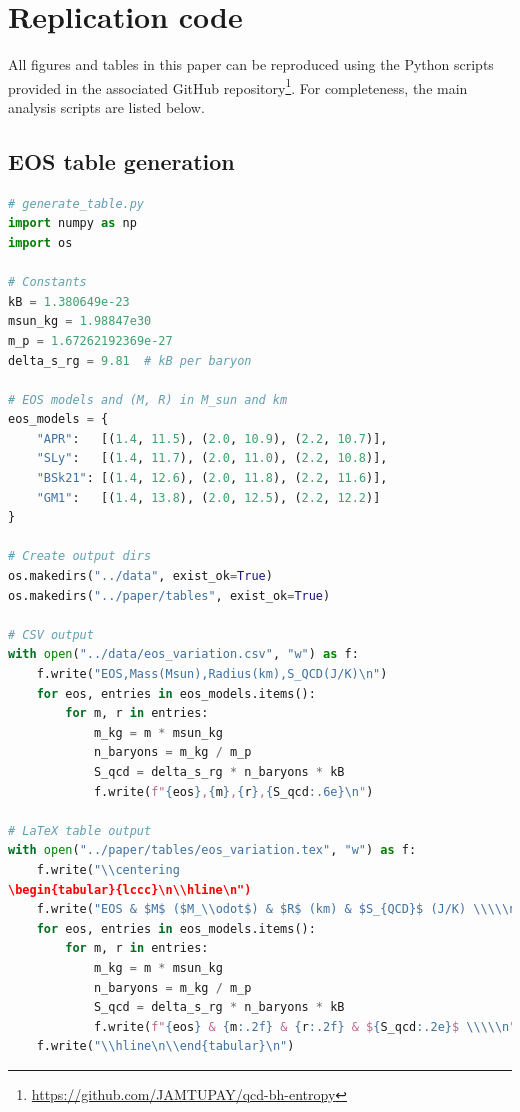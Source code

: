 \documentclass[aps,prd,onecolumn,nofootinbib,superscriptaddress]{revtex4-2}
\begin{document}
\appendix
\section{Replication code}
\label{app:code}

All figures and tables in this paper can be reproduced using the Python scripts provided in the associated GitHub repository\footnote{\url{https://github.com/JAMTUPAY/qcd-bh-entropy}}.  
For completeness, the main analysis scripts are listed below.

\subsection{EOS table generation}
\begin{lstlisting}[language=Python]
# generate_table.py
import numpy as np
import os

# Constants
kB = 1.380649e-23
msun_kg = 1.98847e30
m_p = 1.67262192369e-27
delta_s_rg = 9.81  # kB per baryon

# EOS models and (M, R) in M_sun and km
eos_models = {
    "APR":   [(1.4, 11.5), (2.0, 10.9), (2.2, 10.7)],
    "SLy":   [(1.4, 11.7), (2.0, 11.0), (2.2, 10.8)],
    "BSk21": [(1.4, 12.6), (2.0, 11.8), (2.2, 11.6)],
    "GM1":   [(1.4, 13.8), (2.0, 12.5), (2.2, 12.2)]
}

# Create output dirs
os.makedirs("../data", exist_ok=True)
os.makedirs("../paper/tables", exist_ok=True)

# CSV output
with open("../data/eos_variation.csv", "w") as f:
    f.write("EOS,Mass(Msun),Radius(km),S_QCD(J/K)\n")
    for eos, entries in eos_models.items():
        for m, r in entries:
            m_kg = m * msun_kg
            n_baryons = m_kg / m_p
            S_qcd = delta_s_rg * n_baryons * kB
            f.write(f"{eos},{m},{r},{S_qcd:.6e}\n")

# LaTeX table output
with open("../paper/tables/eos_variation.tex", "w") as f:
    f.write("\\centering
\begin{tabular}{lccc}\n\\hline\n")
    f.write("EOS & $M$ ($M_\\odot$) & $R$ (km) & $S_{QCD}$ (J/K) \\\\\n\\hline\n")
    for eos, entries in eos_models.items():
        for m, r in entries:
            m_kg = m * msun_kg
            n_baryons = m_kg / m_p
            S_qcd = delta_s_rg * n_baryons * kB
            f.write(f"{eos} & {m:.2f} & {r:.2f} & ${S_qcd:.2e}$ \\\\\n")
    f.write("\\hline\n\\end{tabular}\n")
\end{lstlisting}
\end{document}
